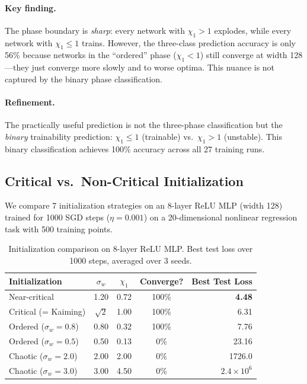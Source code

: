 \documentclass[10pt]{article}
\theoremstyle{definition}
\begin{document}
\paragraph{Key finding.}
The phase boundary is \emph{sharp}: every network with $\chi_1 > 1$ explodes, while every network with $\chi_1 \leq 1$ trains.
However, the three-class prediction accuracy is only 56\% because networks in the ``ordered'' phase ($\chi_1 < 1$) still converge at width 128---they just converge more slowly and to worse optima.
This nuance is not captured by the binary phase classification.

\paragraph{Refinement.}
The practically useful prediction is not the three-phase classification but the \emph{binary} trainability prediction: $\chi_1 \leq 1$ (trainable) vs.\ $\chi_1 > 1$ (unstable).
This binary classification achieves 100\% accuracy across all 27 training runs.

\subsection{Critical vs.\ Non-Critical Initialization}
\label{sec:init-comparison}

We compare 7 initialization strategies on an 8-layer ReLU MLP (width 128) trained for 1000 SGD steps ($\eta = 0.001$) on a 20-dimensional nonlinear regression task with 500 training points.

\begin{table}[t]
\centering
\caption{Initialization comparison on 8-layer ReLU MLP. Best test loss over 1000 steps, averaged over 3 seeds.}
\label{tab:init-comparison}
\begin{tabular}{lcccr}
\toprule
Initialization & $\sigma_w$ & $\chi_1$ & Converge? & Best Test Loss \\
\midrule
Near-critical & 1.20 & 0.72 & 100\% & \textbf{4.48} \\
Critical (= Kaiming) & $\sqrt{2}$ & 1.00 & 100\% & 6.31 \\
Ordered ($\sigma_w = 0.8$) & 0.80 & 0.32 & 100\% & 7.76 \\
Ordered ($\sigma_w = 0.5$) & 0.50 & 0.13 & 0\% & 23.16 \\
Chaotic ($\sigma_w = 2.0$) & 2.00 & 2.00 & 0\% & 1726.0 \\
Chaotic ($\sigma_w = 3.0$) & 3.00 & 4.50 & 0\% & $2.4 \times 10^6$ \\
\bottomrule
\end{tabular}
\end{table}
\end{document}
